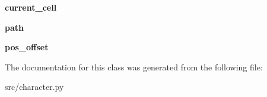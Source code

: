 \begin{DoxyCompactItemize}
\item 
\hypertarget{classsrc_1_1character_1_1_character_a77b7b9a3550d60fea43f3b2173afd6fc}{{\bfseries current\-\_\-cell}}\label{classsrc_1_1character_1_1_character_a77b7b9a3550d60fea43f3b2173afd6fc}

\item 
\hypertarget{classsrc_1_1character_1_1_character_a7d90dc4d446c0b810313cfcdaa0d6aa2}{{\bfseries path}}\label{classsrc_1_1character_1_1_character_a7d90dc4d446c0b810313cfcdaa0d6aa2}

\item 
\hypertarget{classsrc_1_1character_1_1_character_a04b220f94b898f65951cc7506c57d212}{{\bfseries pos\-\_\-offset}}\label{classsrc_1_1character_1_1_character_a04b220f94b898f65951cc7506c57d212}

\end{DoxyCompactItemize}


\-The documentation for this class was generated from the following file\-:\begin{DoxyCompactItemize}
\item 
src/character.\-py\end{DoxyCompactItemize}
